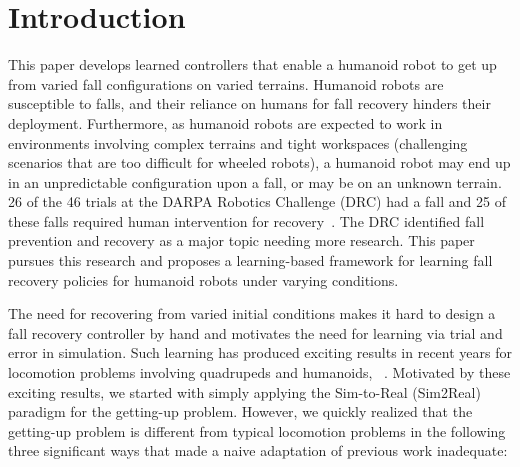 \section{Introduction}
This paper develops learned controllers that enable a humanoid robot to get up
from varied fall configurations on varied terrains.  Humanoid robots are
susceptible to falls, and their reliance on humans for fall recovery hinders their
deployment. Furthermore, as humanoid robots are expected to work in
environments involving complex terrains and tight workspaces (\ie challenging
scenarios that are too difficult for wheeled robots), a humanoid robot may end up
in an unpredictable configuration upon a fall, or may be on an unknown terrain.
26 of the 46 trials at
the DARPA Robotics Challenge (DRC) had a fall and 25 of these falls required
human intervention for recovery~\cite{krotkov2018darpa}. The DRC identified
fall prevention and recovery as a major topic needing more research.  This
paper pursues this research and proposes a learning-based framework for
learning fall recovery policies for humanoid robots under varying
conditions.


The need for recovering from varied initial conditions makes it hard to design a fall recovery controller by hand and motivates the need for learning via trial
and error in simulation. Such learning has produced exciting results
in recent years for locomotion problems involving quadrupeds and
humanoids, \eg~\cite{AgileDynamicMotorSkills19,RealWorldHumanoidLocomotionScienceRobotics24}.
Motivated by these exciting results, we started with simply applying the Sim-to-Real (Sim2Real) paradigm
for the getting-up problem. However, we quickly realized that the getting-up problem is
different from typical locomotion problems in the following three significant
ways that made a naive adaptation of previous work inadequate: 

